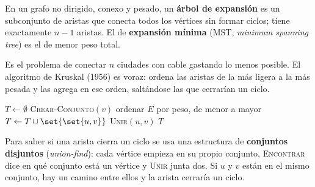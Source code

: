 \documentclass[11pt,letterpaper]{article}
\begin{document}
\begin{definicion}
  En un grafo no dirigido, conexo y pesado, un \textbf{árbol de
  expansión} es un subconjunto de aristas que conecta todos los
  vértices sin formar ciclos; tiene exactamente $n - 1$ aristas. El
  de \textbf{expansión mínima} (MST, \textit{minimum spanning tree})
  es el de menor peso total.
\end{definicion}

Es el problema de conectar $n$ ciudades con cable gastando lo menos
posible. El algoritmo de Kruskal (1956) es voraz: ordena las aristas de
la más ligera a la más pesada y las agrega en ese orden, saltándose las
que cerrarían un ciclo.

\begin{algorithm}[H]
\caption{\textsc{Kruskal}$(G, w)$}
\begin{algorithmic}[1]
\State $T \gets \emptyset$
  \State \textsc{Crear-Conjunto}$(v)$
\EndFor
\State ordenar $E$ por peso, de menor a mayor
    \State $T \gets T \cup \set{\set{u, v}}$
    \State \textsc{Unir}$(u, v)$
  \EndIf
\EndFor
\State \Return $T$
\end{algorithmic}
\end{algorithm}

Para saber si una arista cierra un ciclo se usa una estructura de
\textbf{conjuntos disjuntos} (\textit{union-find}): cada vértice
empieza en su propio conjunto, \textsc{Encontrar} dice en qué conjunto
está un vértice y \textsc{Unir} junta dos. Si $u$ y $v$ están en el
mismo conjunto, hay un camino entre ellos y la arista cerraría un
ciclo.
\end{document}
